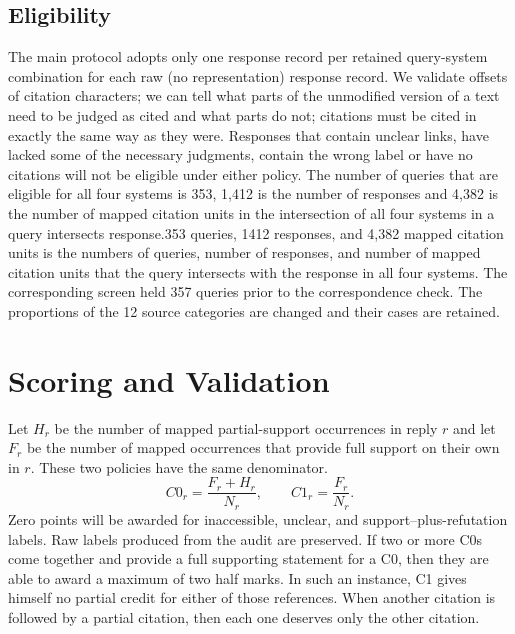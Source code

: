 \documentclass[acmsmall,screen,nonacm]{acmart}
\begin{document}
\subsection{Eligibility}
The main protocol adopts only one response record per retained query-system combination for each raw (no representation) response record. We validate offsets of citation characters; we can tell what parts of the unmodified version of a text need to be judged as cited and what parts do not; citations must be cited in exactly the same way as they were. Responses that contain unclear links, have lacked some of the necessary judgments, contain the wrong label or have no citations will not be eligible under either policy. The number of queries that are eligible for all four systems is 353, 1,412 is the number of responses and 4,382 is the number of mapped citation units in the intersection of all four systems in a query intersects response.353 queries, 1412 responses, and 4,382 mapped citation units is the numbers of queries, number of responses, and number of mapped citation units that the query intersects with the response in all four systems. The corresponding screen held 357 queries prior to the correspondence check. The proportions of the 12 source categories are changed and their cases are retained.

\section{Scoring and Validation}
Let $H_r$ be the number of mapped partial-support occurrences in reply $r$ and let $F_r$ be the number of mapped occurrences that provide full support on their own in $r$. These two policies have the same denominator.
\begin{equation}
 C0_r=\frac{F_r+H_r}{N_r},\qquad C1_r=\frac{F_r}{N_r}.
\end{equation}
Zero points will be awarded for inaccessible, unclear, and support–plus-refutation labels. Raw labels produced from the audit are preserved. If two or more C0s come together and provide a full supporting statement for a C0, then they are able to award a maximum of two half marks. In such an instance, C1 gives himself no partial credit for either of those references. When another citation is followed by a partial citation, then each one deserves only the other citation.
\end{document}
